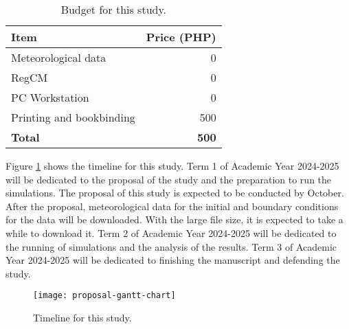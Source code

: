 	\begin{table}
		\caption{Budget for this study.}
		\label{tab:budget}
		\centering
		\begin{tabular}{l r}
			\hline \hline
			Item & Price (PHP) \\
			\hline
			Meteorological data	& 0 \\
			RegCM & 0 \\
			PC Workstation & 0 \\
			Printing and bookbinding & 500 \\
			\hline
			\textbf{Total} & \textbf{500} \\
			\hline
		\end{tabular}
	\end{table}

	Figure \ref{fig:timeline} shows the timeline for this study.
	Term 1 of Academic Year 2024-2025 will be dedicated to the proposal of the study and the preparation to run the simulations.
	The proposal of this study is expected to be conducted by October.
	After the proposal, meteorological data for the initial and boundary conditions for the data will be downloaded.
	With the large file size, it is expected to take a while to download it.
	Term 2 of Academic Year 2024-2025 will be dedicated to the running of simulations and the analysis of the results.
	Term 3 of Academic Year 2024-2025 will be dedicated to finishing the manuscript and defending the study.
	
	\begin{figure}
		\centering
		\texttt{[image: proposal-gantt-chart]}
		\caption{Timeline for this study.}
		\label{fig:timeline}
	\end{figure}